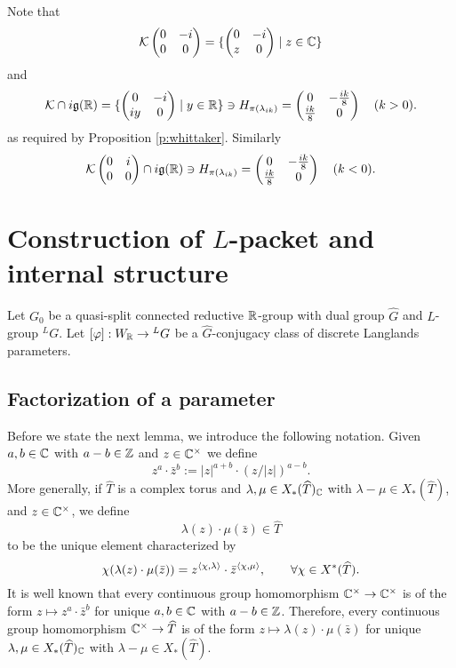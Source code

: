 \documentclass{article}
\theoremstyle{definition}
\numberwithin{equation}{section}
\renewcommand{\-}{\hyp{}}
\newcommand{\g}{\mathfrak g}
\newcommand{\K}{\mathcal K}
\begin{document}
Note that
$$
\K
\begin{pmatrix}0&-i\\0&0
\end{pmatrix}=\{\begin{pmatrix}0&-i\\z&0
\end{pmatrix}\mid z\in\C\}
$$
and
$$
\K\cap i\g(\R)=
\{\begin{pmatrix}0&-i\\iy&0
\end{pmatrix}\mid y\in\R\}\ni H_{\pi(\lambda_{ik})}=\begin{pmatrix}0&-\frac{ik}8\\\frac{ik}8&0\end{pmatrix}\quad (k>0).
$$
as required by Proposition \ref{p:whittaker}.
Similarly
$$
\K\begin{pmatrix}0&i\\0&0\end{pmatrix}\cap i\g(\R)\ni H_{\pi(\lambda_{ik})}=\begin{pmatrix}0&-\frac{ik}8\\\frac{ik}8&0\end{pmatrix}\quad (k<0).
$$





\section{Construction of $L$\-packet and internal structure} \label{sec:cons}

Let $G_0$ be a quasi-split connected reductive $\mathbb{R}$-group with dual group $\hat G$ and $L$\-group $^LG$.
Let $[\varphi] : W_{\mathbb{R}} \to {^LG}$ be a $\hat G$-conjugacy class of discrete Langlands parameters.

\subsection{Factorization of a parameter} \label{sub:fac}

Before we state the next lemma, we introduce the following notation. Given $a,b \in \mathbb{C}$ with $a-b \in \mathbb{Z}$ and $z \in \mathbb{C}^\times$ we define
\[ z^a \cdot \bar z^b := |z|^{a+b} \cdot (z/|z|)^{a-b}. \]
More generally, if $\hat T$ is a complex torus and $\lambda,\mu \in X_*(\widehat T)_{\mathbb{C}}$ with $\lambda-\mu \in X_*(\hat T)$, and $z \in \mathbb{C}^\times$, we define
\[ \lambda(z) \cdot \mu(\bar z) \in \hat T \]
to be the unique element characterized by 
\[ \chi(\lambda(z) \cdot \mu(\bar z)) = z^{\langle\chi,\lambda\rangle} \cdot \bar z^{\langle\chi,\mu\rangle},\qquad \forall \chi \in X^*(\widehat T).\]
It is well known that every continuous group homomorphism $\mathbb{C}^\times \to \mathbb{C}^\times$ is of the form $z \mapsto z^a \cdot \bar z^b$ for unique $a,b \in \mathbb{C}$ with $a-b \in \mathbb{Z}$. Therefore, every continuous group homomorphism $\mathbb{C}^\times \to \widehat T$ is of the form $z \mapsto \lambda(z) \cdot \mu(\bar z)$ for unique $\lambda,\mu \in X_*(\widehat T)_{\mathbb{C}}$ with $\lambda-\mu \in X_*(\hat T)$.
\end{document}
